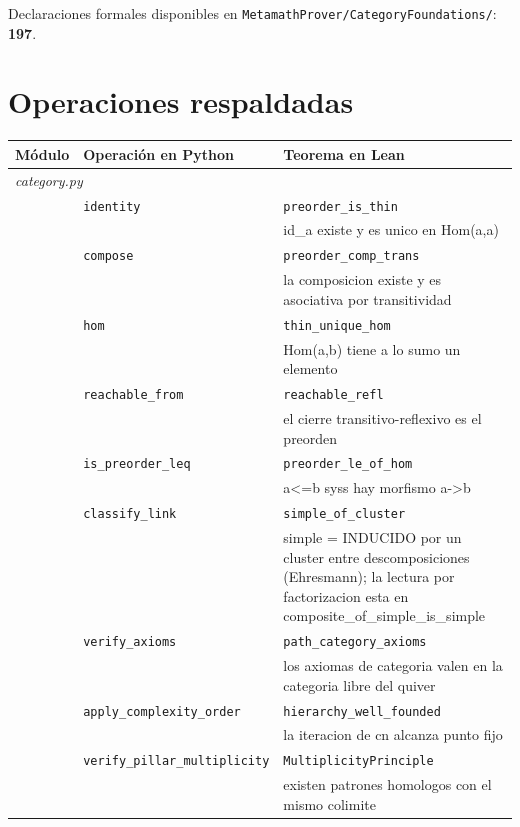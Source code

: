 \documentclass[11pt,a4paper]{article}
\begin{document}
\noindent Declaraciones formales disponibles en
\texttt{MetamathProver/CategoryFoundations/}: \textbf{197}.

\section{Operaciones respaldadas}

\begin{longtable}{@{}p{1.2cm}p{5.9cm}p{7.2cm}@{}}
\toprule
\small Módulo & \small Operación en Python & \small Teorema en Lean \\
\midrule
\endhead
\midrule \multicolumn{3}{l}{\textit{category.py}} \\
  & \texttt{identity} & \texttt{preorder\_is\_thin} \\
  &  & \footnotesize id\_a existe y es unico en Hom(a,a) \\
  & \texttt{compose} & \texttt{preorder\_comp\_trans} \\
  &  & \footnotesize la composicion existe y es asociativa por transitividad \\
  & \texttt{hom} & \texttt{thin\_unique\_hom} \\
  &  & \footnotesize Hom(a,b) tiene a lo sumo un elemento \\
  & \texttt{reachable\_from} & \texttt{reachable\_refl} \\
  &  & \footnotesize el cierre transitivo-reflexivo es el preorden \\
  & \texttt{is\_preorder\_leq} & \texttt{preorder\_le\_of\_hom} \\
  &  & \footnotesize a<=b syss hay morfismo a->b \\
  & \texttt{classify\_link} & \texttt{simple\_of\_cluster} \\
  &  & \footnotesize simple = INDUCIDO por un cluster entre descomposiciones (Ehresmann); la lectura por factorizacion esta en composite\_of\_simple\_is\_simple \\
  & \texttt{verify\_axioms} & \texttt{path\_category\_axioms} \\
  &  & \footnotesize los axiomas de categoria valen en la categoria libre del quiver \\
  & \texttt{apply\_complexity\_order} & \texttt{hierarchy\_well\_founded} \\
  &  & \footnotesize la iteracion de cn alcanza punto fijo \\
  & \texttt{verify\_pillar\_multiplicity} & \texttt{MultiplicityPrinciple} \\
  &  & \footnotesize existen patrones homologos con el mismo colimite \\

\end{longtable}
\end{document}
